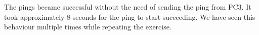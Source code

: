 The pings became successful without the need of sending the ping from PC3.
It took approximately 8 seconds for the ping to start succeeding.
We have seen this behaviour multiple times while repeating the exercise.
